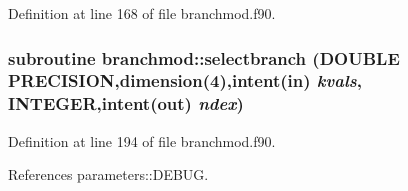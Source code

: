 Definition at line 168 of file branchmod.f90.\hypertarget{namespacebranchmod_a4c2d31e67892bffa2413995834db274a}{
\subsubsection[{selectbranch}]{\setlength{\rightskip}{0pt plus 5cm}subroutine branchmod::selectbranch (DOUBLE PRECISION,dimension(4),intent(in) {\em kvals}, \/  INTEGER,intent(out) {\em ndex})}}
\label{namespacebranchmod_a4c2d31e67892bffa2413995834db274a}


Definition at line 194 of file branchmod.f90.

References parameters::DEBUG.